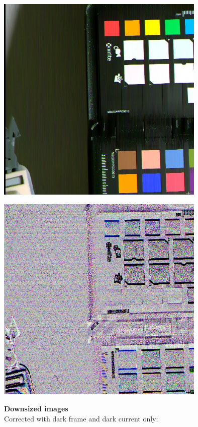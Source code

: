 \begin{center}
\includegraphics[height=10cm]{images/10ms+4-fixrn-dbg-denoised-crop}
\end{center}

\begin{center}
\includegraphics[height=10cm]{images/10ms+4-fixrn-dbg-noise-crop}
\end{center}

\textbf{Downsized images}\\

Corrected with dark frame and dark current only:\\
 
